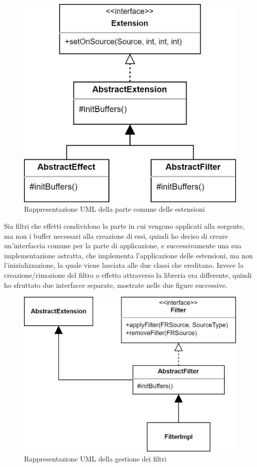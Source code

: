 \documentclass[a4paper,12pt]{report}
\begin{document}
\begin{figure}[H]
\centering{}
\includegraphics[width=\textwidth]{img/Extensions.png}
\caption{Rappresentazione UML della parte comune delle estensioni}
\label{img:extensions}
\end{figure}
Sia filtri che effetti condividono la parte in cui vengono applicati alla sorgente, ma non i buffer necessari alla creazione di essi, quindi ho deciso di creare un’interfaccia comune per la parte di applicazione, e successivamente una sua implementazione astratta, che implementa l’applicazione delle estensioni, ma non l’inizializzazione, la quale viene lasciata alle due classi che ereditano. Invece la creazione/rimozione del filtro o effetto attraverso la libreria era differente, quindi ho sfruttato due interfacce separate, mostrate nelle due figure successive.
%
\begin{figure}[H]
\centering{}
\includegraphics[width=\textwidth]{img/Filter.png}
\caption{Rappresentazione UML della gestione dei filtri}
\label{img:filter}
\end{figure}
\end{document}
